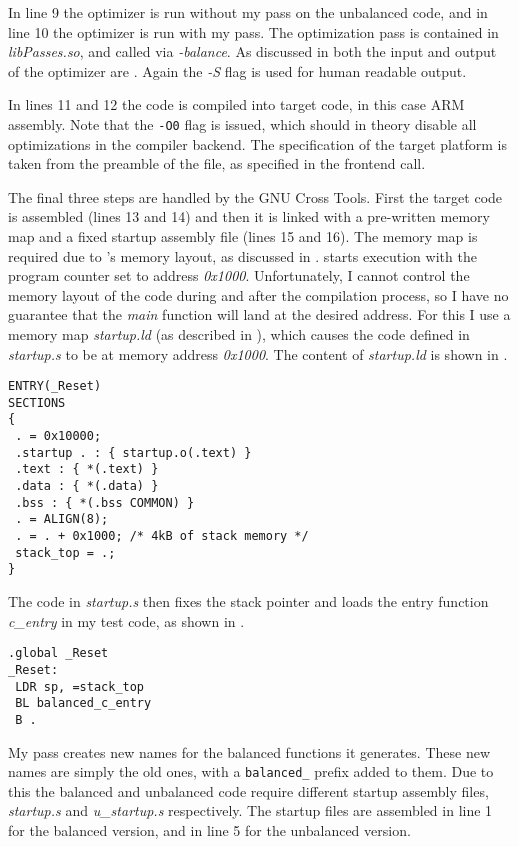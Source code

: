 In line 9 the \llvm{} optimizer is run without my pass on the unbalanced code, and in line 10 the optimizer is run with my pass.
The optimization pass is contained in \emph{libPasses.so}, and called via \emph{-balance}.
As discussed in  both the input and output of the optimizer are \ir{}.
Again the \emph{-S} flag is used for human readable output.

In lines 11 and 12 the \ir{} code is compiled into target code, in this case ARM assembly.
Note that the \texttt{-O0} flag is issued, which should in theory disable all optimizations in the compiler backend.
The specification of the target platform is taken from the preamble of the \ir{} file, as specified in the frontend call.

The final three steps are handled by the GNU Cross Tools.
First the target code is assembled (lines 13 and 14) and then it is linked with a pre-written memory map and a fixed startup assembly file (lines 15 and 16).
The memory map is required due to \qemu{}'s memory layout, as discussed in .
\qemu{} starts execution with the program counter set to address \emph{0x1000}.
Unfortunately, I cannot control the memory layout of the code during and after the compilation process, so I have no guarantee that the \emph{main} function will land at the desired address.
For this I use a memory map \emph{startup.ld} (as described in \cite{armbare}), which causes the code defined in \emph{startup.s} to be at memory address \emph{0x1000}.
The content of \emph{startup.ld} is shown in .

\begin{lstlisting}[caption=Memory map in \emph{startup.ld}, label=lst:mmap]
ENTRY(_Reset)
SECTIONS
{
 . = 0x10000;
 .startup . : { startup.o(.text) }
 .text : { *(.text) }
 .data : { *(.data) }
 .bss : { *(.bss COMMON) }
 . = ALIGN(8);
 . = . + 0x1000; /* 4kB of stack memory */
 stack_top = .;
}
\end{lstlisting}

The code in \emph{startup.s} then fixes the stack pointer and loads the entry function \emph{c\_entry} in my test code, as shown in .

\begin{lstlisting}[caption=Startup assembly code, label=lst:startup]
.global _Reset
_Reset:
 LDR sp, =stack_top
 BL balanced_c_entry
 B .
\end{lstlisting}

My pass creates new names for the balanced functions it generates.
These new names are simply the old ones, with a \texttt{balanced\_} prefix added to them.
Due to this the balanced and unbalanced code require different startup assembly files, \emph{startup.s} and \emph{u\_startup.s} respectively.
The startup files are assembled in line 1 for the balanced version, and in line 5 for the unbalanced version.

